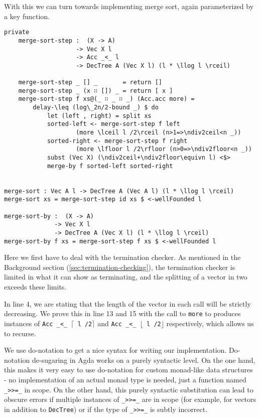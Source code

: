 With this we can turn towards implementing merge sort, again parameterized by a key function.

\begin{lstlisting}[caption={Merge Sort},label={lst:mergesort},emph={DecTree,merge,sort,step,by,recurse,return,delay}]
private
    merge-sort-step :  (X -> A)
                    -> Vec X l
                    -> Acc _<_ l
                    -> DecTree A (Vec X l) (l * \llog l \rceil)

    merge-sort-step _ [] _       = return []
    merge-sort-step _ (x ∷ []) _ = return [ x ]
    merge-sort-step f xs@(_ ∷ _ ∷ _) (Acc.acc more) =
        delay-\leq (log\_2n/2-bound _) $ do
            let (left , right) = split xs
            sorted-left <- merge-sort-step f left
                    (more \lceil l /2\rceil (n>1=>\ndiv2ceil<n _))
            sorted-right <- merge-sort-step f right
                    (more \lfloor l /2\rfloor (n>0=>\ndiv2floor<n _))
            subst (Vec X) (\ndiv2ceil+\ndiv2floor\equivn l) <$>
            merge-by f sorted-left sorted-right


merge-sort : Vec A l -> DecTree A (Vec A l) (l * \llog l \rceil)
merge-sort xs = merge-sort-step id xs $ <-wellFounded l

merge-sort-by :  (X -> A)
              -> Vec X l
              -> DecTree A (Vec X l) (l * \llog l \rceil)
merge-sort-by f xs = merge-sort-step f xs $ <-wellFounded l
\end{lstlisting}

Here we first have to deal with the termination checker. As mentioned in the Background section (\autoref{sec:termination-checking}), the termination checker is limited in what it can show as terminating, and the splitting of a vector in two exceeds these limits.

In line 4, we are stating that the length of the vector in each call will be strictly decreasing. We prove this in line 13 and 15 with the call to \texttt{more} to produces instances of \texttt{Acc \_<\_ $\lceil$ l /2$\rceil$} and \texttt{Acc \_<\_ $\lfloor$ l /2$\rfloor$} respectively, which allows us to recurse.

We use do-notation to get a nice syntax for writing our implementation. Do-notation de-sugaring in Agda works on a purely syntactic level. On the one hand, this makes it very easy to use do-notation for custom monad-like data structures - no implementation of an actual monad type is needed, just a function named \texttt{\_>>=\_} in scope. On the other hand, this purely syntactic substitution can lead to obscure errors if multiple instances of \texttt{\_>>=\_} are in scope (for example, for vectors in addition to \texttt{DecTree}) or if the type of \texttt{\_>>=\_} is subtly incorrect.

